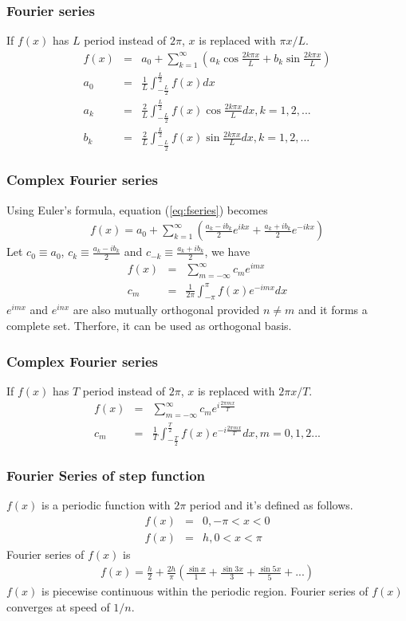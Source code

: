 \documentclass{beamer}
\begin{document}
\begin{frame}
\frametitle{Fourier series}
If $f(x)$ has $L$ period instead of $2\pi$, $x$ is replaced with $\pi x /L$.
\begin{eqnarray}
f(x)&=&a_0 + \sum_{k=1}^{\infty} \left(a_k\cos \frac{2k\pi x}{L} + b_k \sin \frac{2k\pi x}{L}\right) \nonumber \\
a_0&=&\frac{1}{L}\int_{-\frac{L}{2}}^{\frac{L}{2}}f(x) dx \nonumber \\
a_k&=&\frac{2}{L}\int_{-\frac{L}{2}}^{\frac{L}{2}}f(x) \cos \frac{2k\pi x}{L} dx, k = 1,2,...\nonumber \\
b_k&=&\frac{2}{L}\int_{-\frac{L}{2}}^{\frac{L}{2}}f(x) \sin \frac{2k\pi x}{L} dx, k = 1,2,...
\label{eq:fseries_pL}
\end{eqnarray}
\end{frame}
\begin{frame}
\frametitle{Complex Fourier series}
Using Euler's formula, equation (\ref{eq:fseries}) becomes 
\begin{eqnarray}
f(x)=a_0 + \sum_{k=1}^{\infty} \left(\frac{a_k - ib_k}{2} e^{ikx} + \frac{a_k + ib_k}{2}e^{-ikx}\right) \nonumber
\end{eqnarray}
Let $c_0 \equiv a_0$, $c_k \equiv \frac{a_k - ib_k}{2}$ and $c_{-k} \equiv \frac{a_k + ib_k}{2}$, we have
\begin{eqnarray}
f(x)&=&\sum_{m=-\infty}^{\infty} c_m e^{imx} \nonumber \\
c_m&=&\frac{1}{2\pi}\int_{-\pi}^{\pi} f(x) e^{-imx} dx
\label{eq:cfseries}
\end{eqnarray}
$e^{imx}$ and $e^{inx}$ are also mutually orthogonal provided $n \neq m$ and it forms a complete set. Therfore, it can be used as orthogonal basis.\newline
\end{frame}
\begin{frame}
\frametitle{Complex Fourier series}
If $f(x)$ has $T$ period instead of $2\pi$, $x$ is replaced with $2\pi x /T$.
\begin{eqnarray}
f(x)&=&\sum_{m=-\infty}^{\infty} c_m e^{i\frac{2\pi mx}{T}} \nonumber \\
c_m&=&\frac{1}{T}\int_{-\frac{T}{2}}^{\frac{T}{2}} f(x) e^{-i\frac{2\pi mx}{T}} dx, m = 0,1,2...
\label{eq:cfseries_pT}
\end{eqnarray}
\end{frame}
\begin{frame}
\frametitle{Fourier Series of step function}
$f(x)$ is a periodic function with $2\pi$ period and it's defined as follows.
\begin{eqnarray}
f(x)&=& 0, -\pi < x < 0 \nonumber \\
f(x)&=& h, 0 < x < \pi
\label{eq:stepfunc}
\end{eqnarray}
Fourier series of $f(x)$ is
\begin{eqnarray}
f(x)= \frac{h}{2} + \frac{2h}{\pi} \left( \frac{\sin x}{1} + \frac{\sin 3x}{3} + \frac{\sin 5x}{5} + ...\right)
\label{eq:stepfunc_ft}
\end{eqnarray}
$f(x)$ is piecewise continuous within the periodic region. Fourier series of $f(x)$ converges at speed of $1/n$.
\end{frame}
\end{document}
